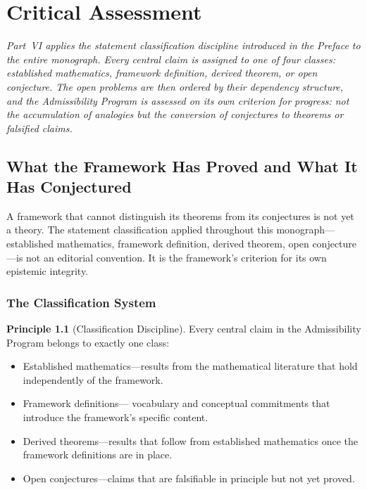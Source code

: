\documentclass[12pt, oneside]{book}
\theoremstyle{flyxion}
\theoremstyle{definition}
\newtheorem{principle}[theorem]{Principle}
\begin{document}
\part{Critical Assessment}

\noindent\textit{Part~VI applies the statement
classification discipline introduced in the Preface
to the entire monograph. Every central claim is
assigned to one of four classes: established
mathematics, framework definition, derived theorem,
or open conjecture. The open problems are then ordered
by their dependency structure, and the Admissibility
Program is assessed on its own criterion for progress:
not the accumulation of analogies but the conversion
of conjectures to theorems or falsified claims.}

\bigskip

\chapter{What the Framework Has Proved and What It
Has Conjectured}

A framework that cannot distinguish its theorems from
its conjectures is not yet a theory. The statement
classification applied throughout this monograph---
established mathematics, framework definition, derived
theorem, open conjecture---is not an editorial
convention. It is the framework's criterion for its
own epistemic integrity.

\section{The Classification System}

\begin{principle}[Classification Discipline]
\label{prin:classification}
Every central claim in the Admissibility Program
belongs to exactly one class:
\begin{itemize}
\item[$\mathcal{M}$:] Established mathematics---results
  from the mathematical literature that hold
  independently of the framework.
\item[$\mathcal{D}$:] Framework definitions---
  vocabulary and conceptual commitments that introduce
  the framework's specific content.
\item[$\mathcal{T}$:] Derived theorems---results that
  follow from established mathematics once the
  framework definitions are in place.
\item[$\mathcal{Q}$:] Open conjectures---claims that
  are falsifiable in principle but not yet proved.
\end{itemize}
\end{principle}
\end{document}
